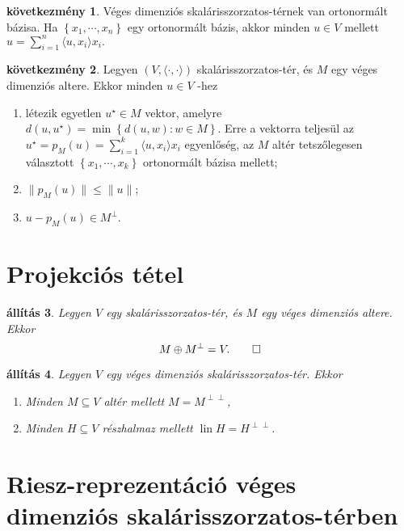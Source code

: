 \documentclass[9pt, a4paper, showtrims]{memoir}
\theoremstyle{plain}
\newtheorem{proposition}{állítás}[chapter]
\theoremstyle{remark}
\theoremstyle{definition}
\newtheorem{corollary}[proposition]{következmény}
\DeclareMathOperator{\lin}{lin}
\newcommand{\ip}[2]{\langle#1,#2\rangle}
\begin{document}
\begin{corollary}
    Véges dimenziós skalárisszorzatos-térnek van ortonormált bázisa.
    Ha $\left\{ x_1,\cdots,x_n \right\}$ egy ortonormált bázis, akkor minden $u\in V$ mellett
    \(
        u=
        \sum_{i=1}^n\ip{u}{x_i}x_i.
    \)
\end{corollary}
\begin{corollary}
    Legyen $\left( V,\ip{\cdot}{\cdot} \right)$ skalárisszorzatos-tér, és $M$ egy 
    véges dimenziós altere.
    Ekkor minden $u\in V$ -hez
    \begin{enumerate}
        \item létezik egyetlen $u^\star\in M$ vektor, amelyre
        \(
        d\left( u,u^\star\right)
        =
        \min\left\{ d\left( u,w \right):w\in M \right\}.
        \)
        Erre a vektorra teljesül az $u^\star=p_M\left( u \right)=\sum_{i=1}^k\ip{u}{x_i}x_i$ egyenlőség, 
        az $M$ altér tetszőlegesen választott  $\left\{ x_1,\cdots,x_k \right\}$ ortonormált bázisa mellett;
        \item
            $\|p_M\left( u \right)\|\leq\|u\|$;
        \item
            \(
            u-p_M(u)\in M^\perp.
            \) 
            \qedhere
    \end{enumerate}
\end{corollary}


\section{Projekciós tétel}

\begin{proposition}
    Legyen $V$ egy skalárisszorzatos-tér, és $M$ egy véges dimenziós altere.
    Ekkor 
    \[
        M\oplus M^\perp=V.
        \qedhere
    \]
\end{proposition}
\begin{proposition}
    Legyen $V$ egy véges dimenziós skalárisszorzatos-tér.
    Ekkor
    \begin{enumerate}
        \item Minden $M\subseteq V$ altér mellett $M=M^{\perp\perp}$,
        \item Minden $H\subseteq V$ részhalmaz mellett $\lin H=H^{\perp\perp}$.
            \qedhere
    \end{enumerate}
\end{proposition}


\section{Riesz-reprezentáció véges dimenziós skalárisszorzatos-térben}
\end{document}
